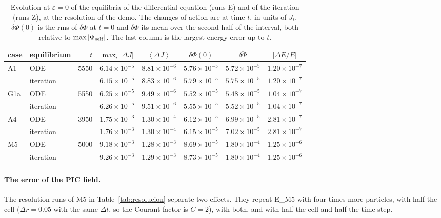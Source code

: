 \documentclass[11pt,a4paper]{article}
\begin{document}
\begin{table}[!htbp]
\centering
\small
\begin{tabular}{llrccccc}
\toprule
case & equilibrium & $t$ & $\max_i|\Delta J|$ & $\langle|\Delta J|\rangle$ & $\delta\Phi(0)$ & $\overline{\delta\Phi}$ & $|\Delta E/E|$\\
\midrule
A1 & ODE & 5550 & $6.14\times10^{-5}$ & $8.81\times10^{-6}$ & $5.76\times10^{-5}$ & $5.72\times10^{-5}$ & $1.20\times10^{-7}$\\
 & iteration & & $6.15\times10^{-5}$ & $8.83\times10^{-6}$ & $5.79\times10^{-5}$ & $5.75\times10^{-5}$ & $1.20\times10^{-7}$\\
G1a & ODE & 5550 & $6.25\times10^{-5}$ & $9.49\times10^{-6}$ & $5.52\times10^{-5}$ & $5.48\times10^{-5}$ & $1.04\times10^{-7}$\\
 & iteration & & $6.26\times10^{-5}$ & $9.51\times10^{-6}$ & $5.55\times10^{-5}$ & $5.52\times10^{-5}$ & $1.04\times10^{-7}$\\
A4 & ODE & 3950 & $1.75\times10^{-3}$ & $1.30\times10^{-4}$ & $6.12\times10^{-5}$ & $6.99\times10^{-5}$ & $2.81\times10^{-7}$\\
 & iteration & & $1.76\times10^{-3}$ & $1.30\times10^{-4}$ & $6.15\times10^{-5}$ & $7.02\times10^{-5}$ & $2.81\times10^{-7}$\\
M5 & ODE & 5000 & $9.18\times10^{-3}$ & $1.28\times10^{-3}$ & $8.69\times10^{-5}$ & $1.80\times10^{-4}$ & $1.25\times10^{-6}$\\
 & iteration & & $9.26\times10^{-3}$ & $1.29\times10^{-3}$ & $8.73\times10^{-5}$ & $1.80\times10^{-4}$ & $1.25\times10^{-6}$\\
\bottomrule
\end{tabular}
\caption{Evolution at $\varepsilon=0$ of the equilibria of the differential equation (runs
E) and of the iteration (runs Z), at the resolution of the demo. The changes of action are
at time $t$, in units of $J_t$. $\delta\Phi(0)$ is the rms of $\delta\Phi$ at $t=0$ and
$\overline{\delta\Phi}$ its mean over the second half of the interval, both relative to
$\max|\Phi_{\rm self}|$. The last column is the largest energy error up to $t$.}
\label{tab:estacionario}
\end{table}

\paragraph{The error of the PIC field.} The resolution runs of M5 in
Table~\ref{tab:resolucion} separate two effects. They repeat E\_M5 with four times more
particles, with half the cell ($\Delta r=0.05$ with the same $\Delta t$, so the Courant
factor is $C=2$), with both, and with half the cell and half the time step.
\end{document}
